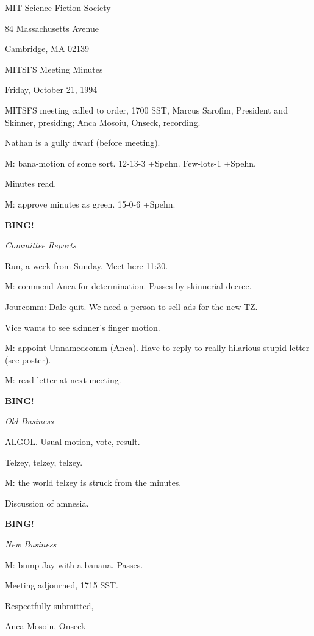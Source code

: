\documentclass[12pt]{article}
\newcommand{\bing}{{\bf BING!} }
\newcommand{\goto}[1]{\bing \vskip 12pt \centerline{{\em{#1}}}}
\begin{document}
\begin{center}

MIT Science Fiction Society 

84 Massachusetts Avenue

Cambridge, MA 02139

\vspace{12pt}

MITSFS Meeting Minutes 

Friday, October 21, 1994

\end{center}
 
\vspace{18pt}

\setlength{\parskip}{6pt}

\noindent
MITSFS meeting called to order, 1700 SST,
Marcus Sarofim, President and Skinner, presiding; Anca Mosoiu, Onseck, recording.

Nathan is a gully dwarf (before meeting).

M: bana-motion of some sort. 12-13-3 +Spehn. Few-lots-1 +Spehn.

Minutes read.

M: approve minutes as green. 15-0-6 +Spehn.

\goto{Committee Reports}

Run, a week from Sunday. Meet here 11:30.

M: commend Anca for determination. Passes by skinnerial decree.

Jourcomm: Dale quit. We need a person to sell ads for the new TZ.

Vice wants to see skinner's finger motion.

M: appoint Unnamedcomm (Anca). Have to reply to really hilarious stupid letter (see poster).

M: read letter at next meeting.

\goto{Old Business}

ALGOL. Usual motion, vote, result.

Telzey, telzey, telzey.

M: the world telzey is struck from the minutes.

Discussion of amnesia.

\goto{New Business}

M: bump Jay with a banana. Passes.

\vspace{12pt}

\noindent
Meeting adjourned, 1715 SST.

\vspace{18pt}

\centerline{Respectfully submitted,}
\centerline{Anca Mosoiu, Onseck}
\end{document}
